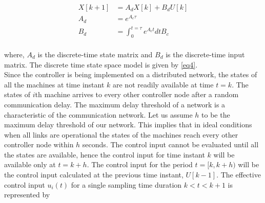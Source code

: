 \documentclass[a4paper]{article}
\begin{document}
\begin{equation}
\label{eq4}
\begin{split}
X[k+1] &= A_{d}X[k] + B_{d}U[k]\\ 
A_{d} &= e^{A_{c}\tau}\\
B_{d} &= \int_{0}^{t = \tau}{e^{A_{c}t} dt} B_{c}\\
\end{split}
\end{equation}

where, $A_{d}$ is the discrete-time state matrix and $B_{d}$ is the discrete-time input matrix. The discrete time state space model is given by \eqref{eq4}.\\
 Since the controller is being implemented on a distributed network, the states of all the machines at time instant $k$ are not readily available at time $t= k$. The states of $i$th machine arrives to every other controller node after a random communication delay. The maximum delay threshold of a network is a characteristic of the communication network. Let us assume $h$ to be the maximum delay threshold of our network. This implies that in ideal conditions when all links are operational the states of the machines reach every other controller node within $h$ seconds. The control input cannot be evaluated until all the states are available, hence the control input for time instant $k$ will be available only at $t = k+h$. The control input for the period $t = [k,k+h)$ will be the control input calculated at the previous time instant, $U[k-1]$. The effective control input $u_{i}(t)$  for a single sampling time duration $ k<t<k+1$ is represented by
\end{document}
